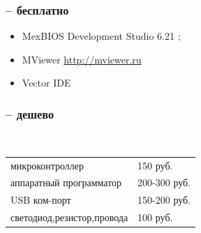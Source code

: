 \begin{frame}
\frametitle{ -- бесплатно}
\begin{itemize}
	\item MexBIOS Development Studio 6.21 \cite{MexBios};
	\item MViewer \url{http://mviewer.ru} 
	\item Vector IDE
\end{itemize}
\end{frame}


\begin{frame}
\frametitle{ -- дешево} 
\begin{figure}
\begin{center}
\begin{minipage}[h]{0.5\linewidth}
  \\
\end{minipage}
\end{center}
\end{figure} 
\begin{tabular}{ll}
микроконтроллер		&150 руб.\\
аппаратный программатор	&200-300 руб.\\
USB ком-порт	&150-200 руб.\\
светодиод,резистор,провода&100 руб.\\
\end{tabular}
\end{frame}


